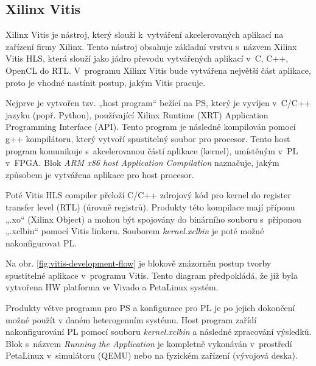 \documentclass[a4paper, twoside, 11pt]{article}
\begin{document}
		\subsection{Xilinx Vitis}\label{subsec:xilinx-vitis}
		Xilinx Vitis je nástroj, který slouží k~vytváření akcelerovaných aplikací na zařízení firmy Xilinx. Tento nástroj obsahuje základní vrstvu s~názvem Xilinx Vitis HLS, která slouží jako jádro převodu vytvářených aplikací v~C, C++, OpenCL do RTL. V~programu Xilinx Vitis bude vytvářena největší část aplikace, proto je vhodné nastínit postup, jakým Vitis pracuje.
		\par
		Nejprve je vytvořen tzv. „host program“ bežící na PS, který je vyvíjen v~C/C++ jazyku (popř. Python), používající Xilinx Runtime (XRT) Application Programming Interface (API). Tento program je následně kompilován pomocí g++ kompilátoru, který vytvoří spustitelný soubor pro procesor. Tento host program komunikuje s~akcelerovanou částí aplikace (kernel), umístěným v~PL v~FPGA. Blok \textit{ARM x86 host Application Compilation} naznačuje, jakým způsobem je vytvářena aplikace pro host procesor. \cite{vitis-unified-software-platform-documentation-2022}\par
		Poté Vitis HLS compiler přeloží C/C++ zdrojový kód pro kernel do register transfer level (RTL) (úrovně registrů). Produkty této kompilace mají příponu „.xo“ (Xilinx Object) a mohou být spojovány do binárního souboru s~příponou „.xclbin“ pomocí Vitis linkeru. Souborem \textit{kernel.xclbin} je poté možné nakonfigurovat PL.\cite{vitis-unified-software-platform-documentation-2022}\par
		Na obr. \ref{fig:vitis-development-flow} je blokově znázorněn postup tvorby spustitelné aplikace v~programu Vitis. Tento diagram předpokládá, že již byla vytvořena HW platforma ve Vivado a PetaLinux systém.\par
		Produkty větve programu pro PS a konfigurace pro PL je po jejich dokončení možné použít v daném heterogenním systému. Host program zařídí nakonfigurování PL pomocí souboru \textit{kernel.xclbin} a následné zpracování výsledků. Blok s~názvem \textit{Running the Application} je kompletně vykonáván v~prostředí PetaLinux v~simulátoru (QEMU) nebo na fyzickém zařízení (vývojová deska).
\end{document}
